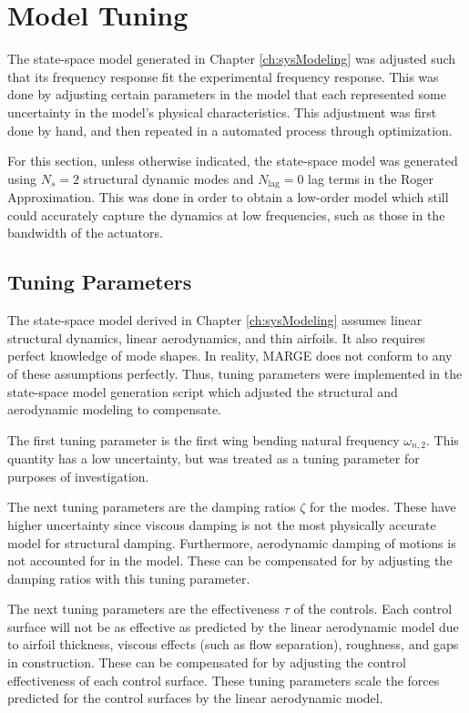 \section{Model Tuning} %

The state-space model generated in Chapter \ref{ch:sysModeling} was adjusted such that its frequency response fit the experimental frequency response. This was done by adjusting certain parameters in the model that each represented some uncertainty in the model's physical characteristics. This adjustment was first done by hand, and then repeated in a automated process through optimization.

For this section, unless otherwise indicated, the state-space model was generated using $N_s=2$ structural dynamic modes and $N_\text{lag}=0$ lag terms in the Roger Approximation. This was done in order to obtain a low-order model which still could accurately capture the dynamics at low frequencies, such as those in the bandwidth of the actuators.

\subsection{Tuning Parameters} %

The state-space model derived in Chapter \ref{ch:sysModeling} assumes linear structural dynamics, linear aerodynamics, and thin airfoils. It also requires perfect knowledge of mode shapes. In reality, MARGE does not conform to any of these assumptions perfectly. Thus, tuning parameters were implemented in the state-space model generation script which adjusted the structural and aerodynamic modeling to compensate.

The first tuning parameter is the first wing bending natural frequency $\omega_{n,2}$. This quantity has a low uncertainty, but was treated as a tuning parameter for purposes of investigation.

The next tuning parameters are the damping ratios $\zeta$ for the modes. These have higher uncertainty since viscous damping is not the most physically accurate model for structural damping. Furthermore, aerodynamic damping of motions is not accounted for in the model. These can be compensated for by adjusting the damping ratios with this tuning parameter.

The next tuning parameters are the effectiveness $\tau$ of the controls. Each control surface will not be as effective as predicted by the linear aerodynamic model due to airfoil thickness, viscous effects (such as flow separation), roughness, and gaps in construction. These can be compensated for by adjusting the control effectiveness of each control surface. These tuning parameters scale the forces predicted for the control surfaces by the linear aerodynamic model.

